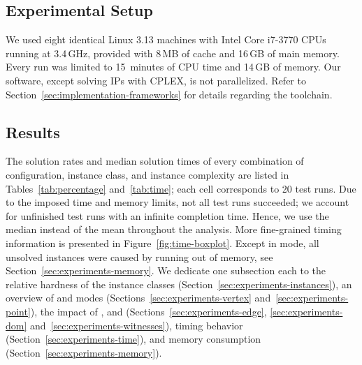 \subsection{Experimental Setup}
\label{sec:experiments-setup}

We used eight identical Linux 3.13 machines with Intel Core i7-3770 CPUs running at 3.4\,GHz, provided with 8\,MB of cache and 16\,GB of main memory.
Every run was limited to 15~minutes of CPU time and 14\,GB of memory.
Our software, except solving \acp{IP} with CPLEX, is not parallelized.
Refer to Section~\ref{sec:implementation-frameworks} for details regarding the toolchain.

\subsection{Results}
\label{sec:experiments-results}

The solution rates and median solution times of every combination of configuration, instance class, and instance complexity are listed in Tables~\ref{tab:percentage} and~\ref{tab:time}; each cell corresponds to 20 test runs.
Due to the imposed time and memory limits, not all test runs succeeded;
we account for unfinished test runs with an infinite completion time.
Hence, we use the median instead of the mean throughout the analysis.
More fine-grained timing information is presented in Figure~\ref{fig:time-boxplot}.
Except in \pnoedge mode, all unsolved instances were caused by running out of memory, see Section~\ref{sec:experiments-memory}.
We dedicate one subsection each to the relative hardness of the instance classes (Section~\ref{sec:experiments-instances}), an overview of \vertexguardmode and \pointguardmode modes (Sections~\ref{sec:experiments-vertex} and~\ref{sec:experiments-point}), the impact of \pointguardfilter, \domfilter and \witnessfilter (Sections~\ref{sec:experiments-edge}, \ref{sec:experiments-dom} and~\ref{sec:experiments-witnesses}), timing behavior (Section~\ref{sec:experiments-time}), and memory consumption (Section~\ref{sec:experiments-memory}).


